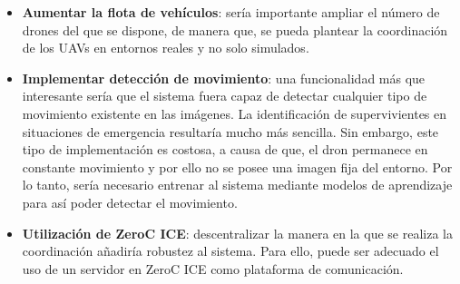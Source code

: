 \begin{itemize}
\item \textbf{Aumentar la flota de vehículos}: sería importante ampliar el número de drones del que se dispone, de manera que, se pueda plantear la coordinación de los \acs{UAV}s en entornos reales y no solo simulados.
\item \textbf{Implementar detección de movimiento}: una funcionalidad más que interesante sería que el sistema fuera capaz de detectar cualquier tipo de movimiento existente en las imágenes. La identificación de supervivientes en situaciones de emergencia resultaría mucho más sencilla. Sin embargo, este tipo de implementación es costosa, a causa de que, el dron permanece en constante movimiento y por ello no se posee una imagen fija del entorno. Por lo tanto, sería necesario entrenar al sistema mediante modelos de aprendizaje para así poder detectar el movimiento.
\item \textbf{Utilización de ZeroC \acs{ICE}}: descentralizar la manera en la que se realiza la coordinación añadiría robustez al sistema. Para ello, puede ser adecuado el uso de un servidor en ZeroC \acs{ICE} como plataforma de comunicación.  
\end{itemize}


